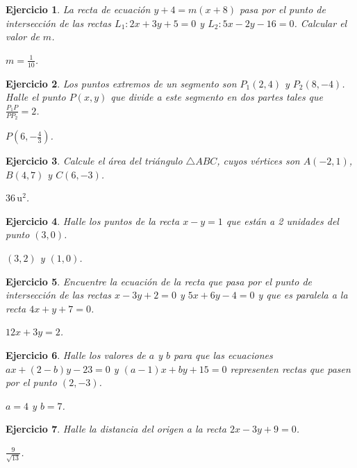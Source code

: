 \documentclass[12pt,a4paper]{article}
\newtheorem{ex}{Ejercicio}
\begin{document}
\begin{itemize}
\begin{ex}
La recta de ecuación $y+4=m(x+8)$ pasa por el punto de intersección de las rectas $L_1: 2x+3y+5=0$ y $L_2: 5x-2y-16=0$. Calcular el valor de $m$. 
\begin{sol} $m=\frac{1}{10}$. \end{sol}
\end{ex}

\begin{ex}
Los puntos extremos de un segmento son $P_1(2,4)$ y $P_2(8,-4)$. Halle el punto $P(x,y)$ que divide a este segmento en dos partes tales que $\frac{P_1P}{PP_2}=2$. 
\begin{sol} $P\left(6,-\frac{4}{3}\right)$. \end{sol}
\end{ex}

\begin{ex}
Calcule el área del triángulo $\triangle ABC$, cuyos vértices son $A(-2,1)$, $B(4,7)$ y $C(6,-3)$. 
\begin{sol} $36\,\text{u}^2$. \end{sol}
\end{ex}

\begin{ex}
Halle los puntos de la recta $x-y=1$ que están a 2 unidades del punto $(3,0)$.
\begin{sol} $(3,2)$ y $(1,0)$. \end{sol}
\end{ex}

\begin{ex}
Encuentre la ecuación de la recta que pasa por el punto de intersección de las rectas $x-3y+2=0$ y $5x+6y-4=0$ y que es paralela a la recta $4x+y+7=0$. 
\begin{sol} $12x + 3y = 2$. \end{sol}
\end{ex}

\begin{ex}
Halle los valores de $a$ y $b$ para que las ecuaciones $ax+(2-b)y-23=0$ y $(a-1)x+by+15=0$ representen rectas que pasen por el punto $(2,-3)$. 
\begin{sol} $a=4$ y $b=7$. \end{sol}
\end{ex}

\begin{ex}
Halle la distancia del origen a la recta $2x-3y+9=0$. 
\begin{sol} $\frac{9}{\sqrt{13}}$. \end{sol}
\end{ex}


\end{itemize}
\end{document}
